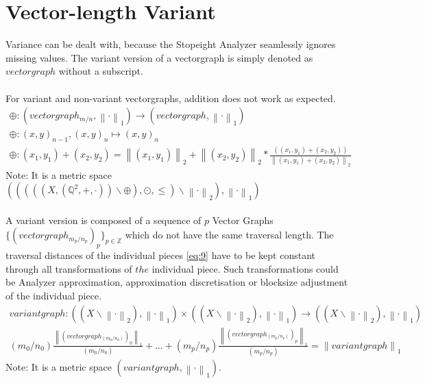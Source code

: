 \documentclass{report}
\newcommand\norm[1]{\left\lVert#1\right\rVert}
\begin{document}
\chapter{Vector-length Variant}
Variance can be dealt with, because the Stopeight Analyzer seamlessly ignores missing values. The variant version of a vectorgraph is simply denoted as $vectorgraph$ without a subscript.\\\\
For variant and non-variant vectorgraphs, addition does not work as expected.
\begin{align}
\oplus : (vectorgraph_{m/n}, \norm{\cdot}_1) \rightarrow (vectorgraph, \norm{\cdot}_1)\\
\oplus : (x,y)_{n-1},(x,y)_{n}\mapsto (x,y)_{n}\\
\oplus : (x_{1},y_{1})+(x_{2},y_{2})=\norm{(x_{1},y_{1})}_2+\norm{(x_{2},y_{2})}_2*\frac{((x_{1},y_{1})+(x_{2},y_{2}))}{\norm{(x_{1},y_{1})+(x_{2},y_{2})}_{2}}
\end{align}
Note: It is a metric space $(((((X,(\mathbb{Q}^2,+,\cdot))\backslash\oplus),\odot,\leq)\backslash\norm{\cdot}_2), \norm{\cdot}_1)$\\\\
A variant version is composed of a sequence of $p$ Vector Graphs $\{(vectorgraph_{m_{p}/n_{p}})_{p}\}_{p\in \mathbb{Z}}$ which do not have the same traversal length. The traversal distances of the individual pieces \eqref{eq:9} have to be kept constant through all transformations of $the$ individual piece. Such transformations could be Analyzer approximation, approximation discretisation or blocksize adjustment of the individual piece.
\begin{align}
variantgraph: ((X\backslash\norm{\cdot}_2),\norm{\cdot}_1)\times ((X\backslash\norm{\cdot}_2),\norm{\cdot}_1) \rightarrow ((X\backslash\norm{\cdot}_2),\norm{\cdot}_1)\\
(m_{0}/n_{0})\frac{\norm{(vectorgraph_{(m_{0}/n_{0})})_{0}}_{1}}{(m_{0}/n_{0})}+...+(m_{p}/n_{p})\frac{\norm{(vectorgraph_{(m_{p}/n_{p})})_{p}}_{1}}{(m_{p}/n_{p})}=\norm{variantgraph}_1
\end{align}
Note: It is a metric space $(variantgraph, \norm{\cdot}_1)$.
\end{document}
